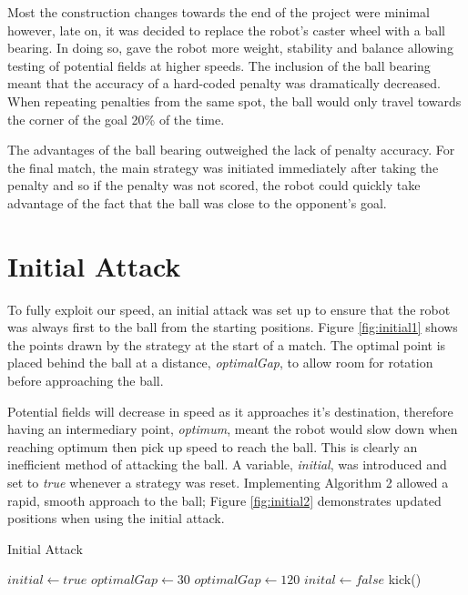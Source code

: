 \documentclass[conference,12pt]{IEEEtran}
\begin{document}
Most the construction changes towards the end of the project were minimal however, late on, it was decided to replace the robot's caster wheel with a ball bearing. In doing so, gave the robot more weight, stability and balance allowing testing of potential fields at higher speeds. The inclusion of the ball bearing meant that the accuracy of a hard-coded penalty was dramatically decreased. When repeating penalties from the same spot, the ball would only travel towards the corner of the goal 20\% of the time.

The advantages of the ball bearing outweighed the lack of penalty accuracy. For the final match, the main strategy was initiated immediately after taking the penalty and so if the penalty was not scored, the robot could quickly take advantage of the fact that the ball was close to the opponent's goal.

\section{Initial Attack}
To fully exploit our speed, an initial attack was set up to ensure that the robot was always first to the ball from the starting positions. Figure \ref{fig:initial1} shows the points drawn by the strategy at the start of a match. The optimal point is placed behind the ball at a distance, \textit{optimalGap}, to allow room for rotation before approaching the ball.

Potential fields will decrease in speed as it approaches it's destination, therefore having an intermediary point, \textit{optimum}, meant the robot would slow down when reaching optimum then pick up speed to reach the ball. This is clearly an inefficient method of attacking the ball. A variable, \textit{initial}, was introduced and set to \textit{true} whenever a strategy was reset. Implementing Algorithm 2 allowed a rapid, smooth approach to the ball; Figure \ref{fig:initial2} demonstrates updated positions when using the initial attack.

\begin{algorithm}
\caption{Initial Attack}
\begin{algorithmic}[1]
\STATE $initial\gets true$
			\STATE $optimalGap\gets 30$
		\ELSE
			\STATE $optimalGap\gets 120$
			\STATE $inital\gets false$
			\STATE kick()
		\ENDIF
	\ENDIF
\ENDWHILE
\end{algorithmic}
\end{algorithm}
\end{document}
